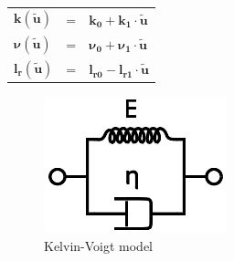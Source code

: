 \documentclass[pdftex,a4paper,11pt]{article}
\newcommand{\vs}[1]{\boldsymbol{#1}} %
\numberwithin{equation}{subsection}
\begin{document}
\paragraph{}
\begin{tabular}{lcl}
    $\vs{k}  (\vs{\tilde{u}})$  & = &  $\vs{k_0}    + \vs{k_1}    \cdot \vs{\tilde{u}}$ \\
    $\vs{\nu}(\vs{\tilde{u}})$  & = &  $\vs{\nu_0}  + \vs{\nu_1}  \cdot \vs{\tilde{u}}$ \\
    $\vs{l_r}(\vs{\tilde{u}})$  & = &  $\vs{l_{r0}} - \vs{l_{r1}} \cdot \vs{\tilde{u}}$ \\
\end{tabular}

\begin{figure}[h]
    \centering
    \includegraphics[width=.20\linewidth]{fig/Kelvin_Voigt_diagram}
    \caption{Kelvin-Voigt model}
\end{figure}
\end{document}
